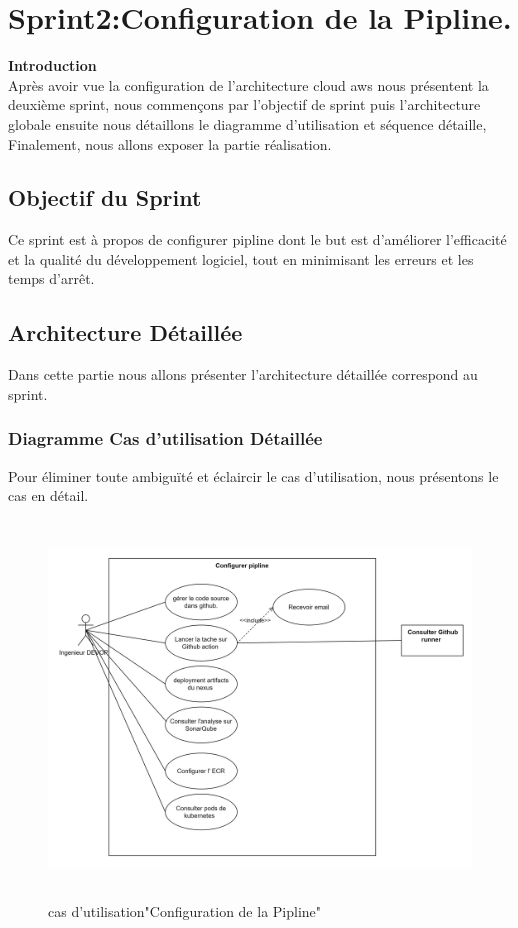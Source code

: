 \chapter{Sprint2:Configuration de la Pipline.}
\newpage
\textbf{\huge Introduction} \\[1cm]
\textsf{\selectfont{}
Après avoir vue la configuration de l'architecture cloud aws nous présentent la deuxième sprint, nous commençons par l'objectif de sprint puis l'architecture globale ensuite nous détaillons le diagramme d'utilisation et séquence détaille, Finalement, nous allons exposer la partie réalisation.}


\section{\LARGE Objectif du Sprint}
\textsf{\selectfont{}Ce sprint est à propos de configurer pipline  dont le but est d'améliorer l'efficacité et la qualité du développement logiciel, tout en minimisant les erreurs et les temps d'arrêt.}

\section{\LARGE Architecture Détaillée}
\textsf{\selectfont{}Dans cette partie nous allons présenter l'architecture détaillée correspond au sprint.}

\subsection{\Large Diagramme Cas d'utilisation Détaillée}
\textsf{\selectfont{}Pour éliminer toute ambiguïté et éclaircir le cas d'utilisation, nous présentons le cas en détail.}

\begin{figure}[H]
    \begin{center}
    \includegraphics[height=10cm]{configuration pipline use case.png}
    \end{center}
    \caption{cas d’utilisation"Configuration de la Pipline"}
    \end{figure}

